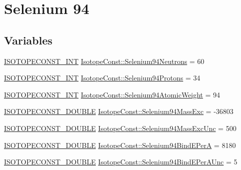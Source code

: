 \hypertarget{group___isotope_const-_selenium-_se94}{}\section{Selenium 94}
\label{group___isotope_const-_selenium-_se94}
\subsection*{Variables}
\begin{DoxyCompactItemize}
\item 
\mbox{\hyperlink{group___isotope_const-_macros_ga5f18360b3e99483a35c32d789e62621c}{I\+S\+O\+T\+O\+P\+E\+C\+O\+N\+S\+T\+\_\+\+I\+NT}} \mbox{\hyperlink{group___isotope_const-_selenium-_se94_gaa2cf6fda8186c1a0b33721049ee54168}{Isotope\+Const\+::\+Selenium94\+Neutrons}} = 60
\item 
\mbox{\hyperlink{group___isotope_const-_macros_ga5f18360b3e99483a35c32d789e62621c}{I\+S\+O\+T\+O\+P\+E\+C\+O\+N\+S\+T\+\_\+\+I\+NT}} \mbox{\hyperlink{group___isotope_const-_selenium-_se94_gad2a2f79379fed8d89f26c483c595b3a8}{Isotope\+Const\+::\+Selenium94\+Protons}} = 34
\item 
\mbox{\hyperlink{group___isotope_const-_macros_ga5f18360b3e99483a35c32d789e62621c}{I\+S\+O\+T\+O\+P\+E\+C\+O\+N\+S\+T\+\_\+\+I\+NT}} \mbox{\hyperlink{group___isotope_const-_selenium-_se94_ga68c80d4005fba5473f3faf71f31d39aa}{Isotope\+Const\+::\+Selenium94\+Atomic\+Weight}} = 94
\item 
\mbox{\hyperlink{group___isotope_const-_macros_ga8f45a7272ce02c0b4c65c44636ed719a}{I\+S\+O\+T\+O\+P\+E\+C\+O\+N\+S\+T\+\_\+\+D\+O\+U\+B\+LE}} \mbox{\hyperlink{group___isotope_const-_selenium-_se94_ga8b91c5dce31890ae94450ae8794dda6d}{Isotope\+Const\+::\+Selenium94\+Mass\+Exc}} = -\/36803
\item 
\mbox{\hyperlink{group___isotope_const-_macros_ga8f45a7272ce02c0b4c65c44636ed719a}{I\+S\+O\+T\+O\+P\+E\+C\+O\+N\+S\+T\+\_\+\+D\+O\+U\+B\+LE}} \mbox{\hyperlink{group___isotope_const-_selenium-_se94_gac9f421a07aa9925da42a7c95f72d4660}{Isotope\+Const\+::\+Selenium94\+Mass\+Exc\+Unc}} = 500
\item 
\mbox{\hyperlink{group___isotope_const-_macros_ga8f45a7272ce02c0b4c65c44636ed719a}{I\+S\+O\+T\+O\+P\+E\+C\+O\+N\+S\+T\+\_\+\+D\+O\+U\+B\+LE}} \mbox{\hyperlink{group___isotope_const-_selenium-_se94_ga70766a6726b525ff73ea8028c8cd1bf9}{Isotope\+Const\+::\+Selenium94\+Bind\+E\+PerA}} = 8180
\item 
\mbox{\hyperlink{group___isotope_const-_macros_ga8f45a7272ce02c0b4c65c44636ed719a}{I\+S\+O\+T\+O\+P\+E\+C\+O\+N\+S\+T\+\_\+\+D\+O\+U\+B\+LE}} \mbox{\hyperlink{group___isotope_const-_selenium-_se94_ga9f40fcd602cbd5f43685650e89e6d359}{Isotope\+Const\+::\+Selenium94\+Bind\+E\+Per\+A\+Unc}} = 5

\end{DoxyCompactItemize}

